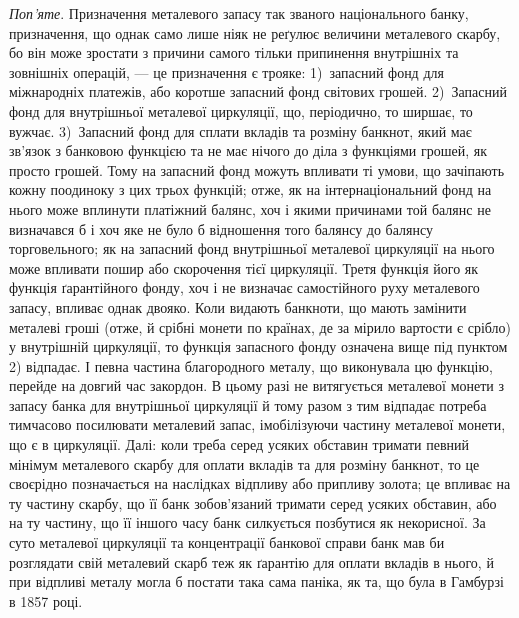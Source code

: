 \emph{Поп’яте}. Призначення металевого запасу так званого національного
банку, призначення, що однак само лише ніяк не реґулює величини металевого
скарбу, бо він може зростати з причини самого тільки припинення внутрішніх
та зовнішніх операцій, — це призначення є трояке: 1)~запасний фонд для міжнародніх
платежів, або коротше запасний фонд світових грошей. 2)~Запасний
фонд для внутрішньої металевої циркуляції, що, періодично, то ширшає, то
вужчає. 3)~Запасний фонд для сплати вкладів та розміну банкнот, який має
зв’язок з банковою функцією та не має нічого до діла з функціями грошей, як
просто грошей. Тому на запасний фонд можуть впливати ті умови, що зачіпають
кожну поодиноку з цих трьох функцій; отже, як на інтернаціональний
фонд на нього може вплинути платіжний балянс, хоч і якими причинами
той балянс не визначався б і хоч яке не було б відношення того балянсу
до балянсу торговельного; як на запасний фонд внутрішньої металевої циркуляції
на нього може впливати пошир або скорочення тієї циркуляції. Третя
функція його як функція ґарантійного фонду, хоч і не визначає самостійного
руху металевого запасу, впливає однак двояко. Коли видають банкноти, що мають
замінити металеві гроші (отже, й срібні монети по країнах, де за мірило вартости
є срібло) у внутрішній циркуляції, то функція запасного фонду означена вище
під пунктом 2) відпадає. І певна частина благородного металу, що виконувала
цю функцію, перейде на довгий час закордон. В цьому разі не витягується металевої монети з запасу
банка для внутрішньої циркуляції й тому разом з тим відпадає
потреба тимчасово посилювати металевий запас, імобілізуючи частину металевої
монети, що є в циркуляції. Далі: коли треба серед усяких обставин тримати певний
мінімум металевого скарбу для оплати вкладів та для розміну банкнот, то це
своєрідно позначається на наслідках відпливу або припливу золота; це впливає
на ту частину скарбу, що її банк зобов’язаний тримати серед усяких обставин,
або на ту частину, що її іншого часу банк силкується позбутися як некорисної.
За суто металевої циркуляції та концентрації банкової справи банк мав би
розглядати свій металевий скарб теж як ґарантію для оплати вкладів в нього,
й при відпливі металу могла б постати така сама паніка, як та, що була в Гамбурзі
в 1857 році.
